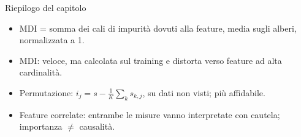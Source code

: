 \begin{appunti}{Riepilogo del capitolo}
\begin{itemize}
  \item MDI = somma dei cali di impurità dovuti alla feature, media sugli alberi, normalizzata a 1.
  \item MDI: veloce, ma calcolata sul training e distorta verso feature ad alta cardinalità.
  \item Permutazione: $i_j=s-\frac1K\sum_k s_{k,j}$, su dati non visti; più affidabile.
  \item Feature correlate: entrambe le misure vanno interpretate con cautela; importanza $\ne$ causalità.
\end{itemize}
\end{appunti}
